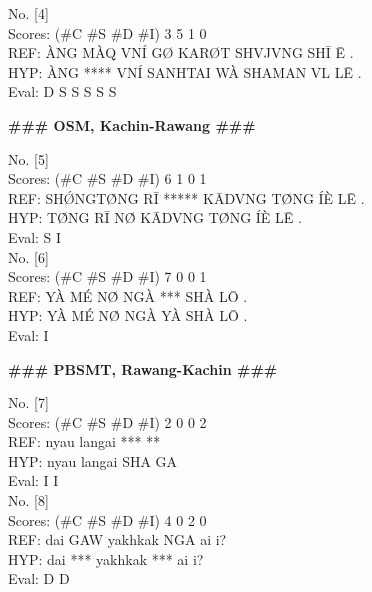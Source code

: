 \documentclass[conference]{IEEEtran}
\begin{document}
\noindent No. [4]\\
\noindent Scores: (\#C \#S \#D \#I) 3 5 1 0\\
REF:  ÀNG MÀQ VNÍ GØ     KARØT SHVJVNG SHĪ Ē  . \\
HYP:  ÀNG **** VNÍ SANHTAI WÀ    SHAMAN  VL   LĒ . \\
Eval:      D         S       S      S       S    S \\

\begin{center} \textbf{\#\#\# OSM, Kachin-Rawang \#\#\#}  \\ \end{center}

\noindent No. [5]\\
\noindent Scores: (\#C \#S \#D \#I) 6 1 0 1\\
REF:  SHǾNGTØ̀NG RĪ ***** KĀDVNG TØ̀NG ÍÈ LĒ . \\
HYP:  TØ̀NG       RĪ NØ̀ KĀDVNG TØ̀NG ÍÈ LĒ . \\
Eval:  S                 I   \\
 
\hfill \break
\noindent No. [6]\\
\noindent Scores: (\#C \#S \#D \#I) 7 0 0 1\\
REF:  YÀ MÉ NØ̀ NGÀ *** SHÀ LŌ . \\
HYP:  YÀ MÉ NØ̀ NGÀ YÀ SHÀ LŌ . \\
Eval:                    I \\

\begin{center} \textbf{\#\#\# PBSMT, Rawang-Kachin \#\#\#}  \\ \end{center}

\noindent No. [7]\\
\noindent Scores: (\#C \#S \#D \#I) 2 0 0 2\\
REF:  nyau langai *** ** \\
HYP:  nyau langai SHA GA \\
Eval:             I   I\\

\noindent No. [8]\\
\noindent Scores: (\#C \#S \#D \#I) 4 0 2 0\\
REF:  dai GAW yakhkak NGA ai i? \\
HYP:  dai *** yakhkak *** ai i? \\
Eval:     D           D  \\
\end{document}
